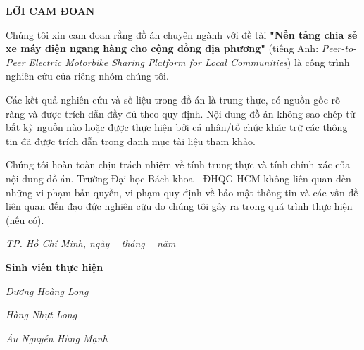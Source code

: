 
\newpage
\thispagestyle{empty}
\begin{center}
    \textbf{\Large LỜI CAM ĐOAN}
\end{center}

\vspace{1cm}

Chúng tôi xin cam đoan rằng đồ án chuyên ngành với đề tài \textbf{"Nền tảng chia sẻ xe máy điện ngang hàng cho cộng đồng địa phương"} (tiếng Anh: \textit{Peer-to-Peer Electric Motorbike Sharing Platform for Local Communities}) là công trình nghiên cứu của riêng nhóm chúng tôi.

Các kết quả nghiên cứu và số liệu trong đồ án là trung thực, có nguồn gốc rõ ràng và được trích dẫn đầy đủ theo quy định. Nội dung đồ án không sao chép từ bất kỳ nguồn nào hoặc được thực hiện bởi cá nhân/tổ chức khác trừ các thông tin đã được trích dẫn trong danh mục tài liệu tham khảo.

Chúng tôi hoàn toàn chịu trách nhiệm về tính trung thực và tính chính xác của nội dung đồ án. Trường Đại học Bách khoa - ĐHQG-HCM không liên quan đến những vi phạm bản quyền, vi phạm quy định về bảo mật thông tin và các vấn đề liên quan đến đạo đức nghiên cứu do chúng tôi gây ra trong quá trình thực hiện (nếu có).

\vspace{2cm}

\begin{flushright}
\textit{TP. Hồ Chí Minh, ngày \ngay~ tháng \thang~ năm \nam}

\vspace{1.5cm}
\par\hfill\textbf{Sinh viên thực hiện}\hspace{1cm}
\par\hfill\textit{Dương Hoàng Long}
\par\hfill\textit{Hàng Nhựt Long}\hspace{0.3cm}
\par\hfill\textit{Âu Nguyễn Hùng Mạnh}\hspace{0.2cm}
\end{flushright}

\newpage

